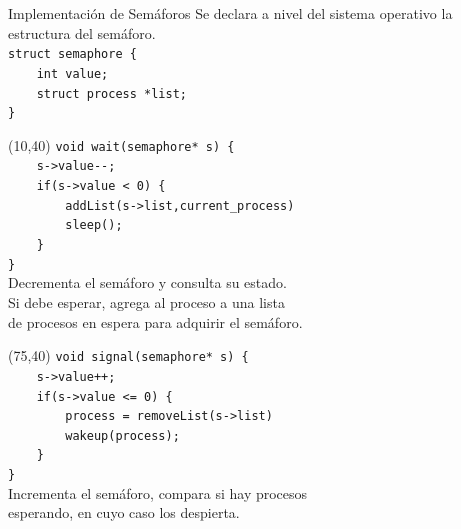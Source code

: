 \documentclass[aspectratio=169]{beamer}
\begin{document}
\begin{frame}[fragile,t]{Implementación de Semáforos}
    Se declara a nivel del sistema operativo la estructura del semáforo.\\
    \bigskip
    \footnotesize
    \verb|struct semaphore {       |\\
    \verb|    int value;           |\\
    \verb|    struct process *list;|\\
    \verb|}                        |\\
    \begin{textblock}{65}(10,40) 
    \footnotesize
    \verb|void wait(semaphore* s) {               |\\
    \verb|    s->value--;                         |\\
    \verb|    if(s->value < 0) {                  |\\
    \verb|        addList(s->list,current_process)|\\
    \verb|        sleep();                        |\\
    \verb|    }                                   |\\
    \verb|}                                       |\\
    \bigskip
    Decrementa el semáforo y consulta su estado.\\
    Si debe esperar, agrega al proceso a una lista\\
    de procesos en espera para adquirir el semáforo.
    \end{textblock}
    \begin{textblock}{65}(75,40)
    \footnotesize
    \verb|void signal(semaphore* s) {            |\\
    \verb|    s->value++;                        |\\
    \verb|    if(s->value <= 0) {                |\\
    \verb|        process = removeList(s->list)  |\\
    \verb|        wakeup(process);               |\\
    \verb|    }                                  |\\
    \verb|}                                      |\\
    \bigskip
    Incrementa el semáforo, compara si hay procesos\\
    esperando, en cuyo caso los despierta.
    \end{textblock}
\end{frame}
\end{document}
